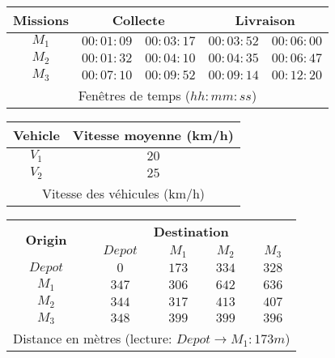 \begin{figure}[ht]
\begin{changemargin}{-1cm}{-1cm}
 \tiny
 \begin{center}
    \begin{tabular}{|c|c|c|c|c|} 
    \hline
    {\bf Missions} & \multicolumn{2}{|c|}{\bf Collecte} & \multicolumn{2}{|c|}{\bf Livraison} \\ \hline
    $M_1$	 & $00:01:09$ & $00:03:17$	& $00:03:52$ & $00:06:00$\\
    $M_2$	 & $00:01:32$ & $00:04:10$	& $00:04:35$ & $00:06:47$\\
    $M_3$	 & $00:07:10$ & $00:09:52$	& $00:09:14$ & $00:12:20$\\
    \hline
    \multicolumn{5}{c}{Fenêtres de temps ($hh:mm:ss$)}
    \end{tabular}
\end{center}
\begin{center}
    \begin{tabular}{|c|c|} 
    \hline
    {\bf Vehicle} & {\bf Vitesse moyenne (km/h)} \\ \hline
    $V_1$	 & $20$\\
    $V_2$	 & $25$\\
    \hline
    \multicolumn{2}{c}{Vitesse des véhicules (km/h)}
    \end{tabular}
  \end{center}
  
  \begin{center}
    \begin{tabular}{|c|c|c|c|c|} 
    \hline
    
    \multirow{2}{*}{\bf{Origin}} & \multicolumn{4}{c|}{\bf{Destination}}\\ \cline{2-5}
    	 	& {\bf $Depot$}	& {\bf $M_1$}	& $M_2$		& $M_3$\\ \hline
    {\bf $Depot$}	& $0$		& $173$		& $334$		& $328$\\
    {\bf $M_1$}		& $347$		& $306$		& $642$		& $636$\\
    {\bf $M_2$}		& $344$		& $317$		& $413$		& $407$\\
    {\bf $M_3$}		& $348$		& $399$		& $399$		& $396$\\
    \hline
    \multicolumn{5}{c}{Distance en mètres (lecture: $Depot\rightarrow M_1 : 173 m$)}
    \end{tabular}

  \end{center}


\end{changemargin}
\end{figure}
